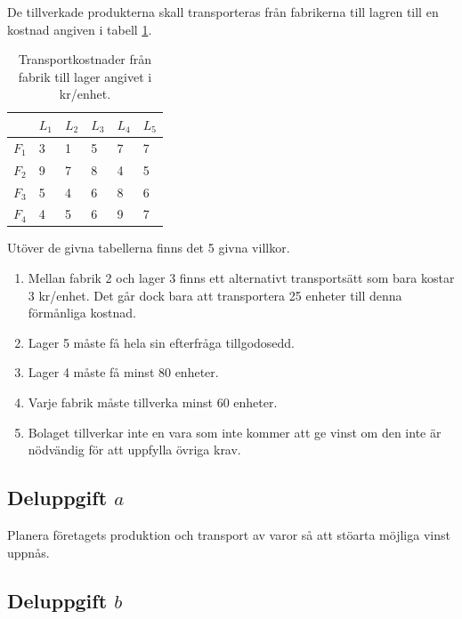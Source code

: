 \documentclass[titlepage, a4paper]{article}
\begin{document}
De tillverkade produkterna skall transporteras från fabrikerna till lagren till en kostnad angiven i tabell \ref{transportkostnader}.

\begin{table}[h!]
    \centering
    \begin{tabular}{ | l | l | l | l | l | l | }
        \hline
        {} & {$L_{1}$} & {$L_{2}$} & {$L_{3}$} & {$L_{4}$} & {$L_{5}$} \\\hline
        {$F_{1}$} & {3} & {1} & {5} & {7} & {7} \\\hline
        {$F_{2}$} & {9} & {7} & {8} & {4} & {5} \\\hline
        {$F_{3}$} & {5} & {4} & {6} & {8} & {6} \\\hline
        {$F_{4}$} & {4} & {5} & {6} & {9} & {7} \\\hline
    \end{tabular}
    \caption{Transportkostnader från fabrik till lager angivet i kr/enhet.} \label{transportkostnader}
\end{table}

Utöver de givna tabellerna finns det 5 givna villkor.

\begin{enumerate}
\item{Mellan fabrik 2 och lager 3 finns ett alternativt transportsätt som bara kostar 3 kr/enhet. Det går dock bara att transportera 25 enheter till denna förmånliga kostnad.} \label{bivillkor1}
\item{Lager 5 måste få hela sin efterfråga tillgodosedd.} \label{bivillkor2}
\item{Lager 4 måste få minst 80 enheter.} \label{bivillkor3}
\item{Varje fabrik måste tillverka minst 60 enheter.} \label{bivillkor4}
\item{Bolaget tillverkar inte en vara som inte kommer att ge vinst om den inte är nödvändig för att uppfylla övriga krav.} \label{bivillkor5}
\end{enumerate}


\subsection{Deluppgift $a$}

Planera företagets produktion och transport av varor så att stöarta möjliga vinst uppnås.

\subsection{Deluppgift $b$}
\end{document}
